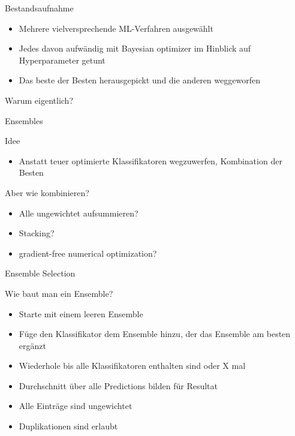 \documentclass{beamer}
\begin{document}
	\begin{frame}{Bestandsaufnahme}
		\begin{itemize}
			\item Mehrere vielversprechende ML-Verfahren ausgewählt
			\item Jedes davon aufwändig mit Bayesian optimizer im Hinblick auf Hyperparameter getunt
			\item Das beste der Besten herausgepickt und die anderen weggeworfen
		\end{itemize}
		\pause
		\alert{\LARGE{Warum eigentlich?}}
	\end{frame}
	
	\begin{frame}{Ensembles}
		\begin{alertblock}{Idee}
			\begin{itemize}
				\item Anstatt teuer optimierte Klassifikatoren wegzuwerfen, Kombination der Besten
			\end{itemize}
		\end{alertblock}
		\pause
		\alert{Aber wie kombinieren?}
		\begin{itemize}
			\item Alle ungewichtet aufsummieren?
			\item Stacking?
			\item gradient-free numerical optimization?
		\end{itemize}
	\end{frame}
	
	\begin{frame}{Ensemble Selection}
		\begin{alertblock}{Wie baut man ein Ensemble?}
			\begin{itemize}
				\item Starte mit einem leeren Ensemble
				\item Füge den Klassifikator dem Ensemble hinzu, der das Ensemble am besten ergänzt
				\item Wiederhole bis alle Klassifikatoren enthalten sind oder X mal
				\item Durchschnitt über alle Predictions bilden für Resultat
				\pause
				\item Alle Einträge sind ungewichtet
				\item Duplikationen sind erlaubt
			\end{itemize}
	\end{alertblock}
	\end{frame}
	
\end{document}
